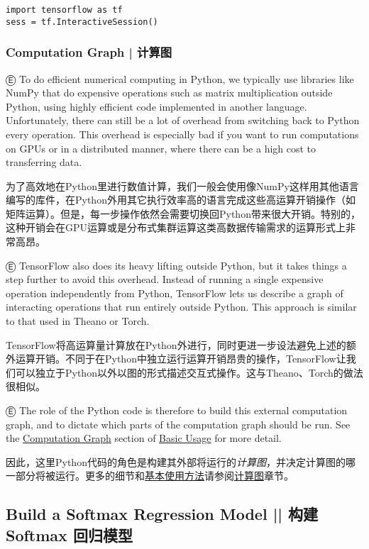 \begin{lstlisting}
import tensorflow as tf
sess = tf.InteractiveSession()
\end{lstlisting}

\subsubsection {Computation Graph  |  计算图}

Ⓔ \textcolor{etc}{To do efficient numerical computing in Python, we typically use libraries like NumPy that do expensive operations such as matrix multiplication outside Python, using highly efficient code implemented in another language. Unfortunately, there can still be a lot of overhead from switching back to Python every operation. This overhead is especially bad if you want to run computations on GPUs or in a distributed manner, where there can be a high cost to transferring data.}

为了高效地在Python里进行数值计算，我们一般会使用像NumPy这样用其他语言编写的库件，在Python外用其它执行效率高的语言完成这些高运算开销操作（如矩阵运算）。但是，每一步操作依然会需要切换回Python带来很大开销。特别的，这种开销会在GPU运算或是分布式集群运算这类高数据传输需求的运算形式上非常高昂。

Ⓔ \textcolor{etc}{TensorFlow also does its heavy lifting outside Python, but it takes things a step further to avoid this overhead. Instead of running a single expensive operation independently from Python, TensorFlow lets us describe a graph of interacting operations that run entirely outside Python. This approach is similar to that used in Theano or Torch.}

TensorFlow将高运算量计算放在Python外进行，同时更进一步设法避免上述的额外运算开销。不同于在Python中独立运行运算开销昂贵的操作，TensorFlow让我们可以独立于Python以外以图的形式描述交互式操作。这与Theano、Torch的做法很相似。

Ⓔ \textcolor{etc}{The role of the Python code is therefore to build this external computation graph, and to dictate which parts of the computation graph should be run. See the \hyperref[computation_graph]{Computation Graph} section of \hyperref[basic_usage]{Basic Usage} for more detail.}

因此，这里Python代码的角色是构建其外部将运行的\emph{计算图}，并决定计算图的哪一部分将被运行。更多的细节和\hyperref[basic_usage]{基本使用方法}请参阅\hyperref[computation_graph]{计算图}章节。

%
\subsection{Build a Softmax Regression Model  ||  构建 Softmax 回归模型}

